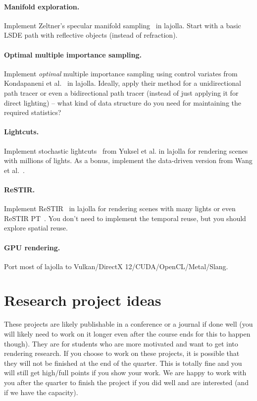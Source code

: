 \paragraph{Manifold exploration.} Implement Zeltner's specular manifold sampling~\cite{Zeltner:2020:SMS} in lajolla. Start with a basic LSDE path with reflective objects (instead of refraction).

\paragraph{Optimal multiple importance sampling.}
Implement \emph{optimal} multiple importance sampling using control variates from Kondapaneni et al.~\cite{Kondapaneni:2019:OMI} in lajolla.
Ideally, apply their method for a unidirectional path tracer or even a bidirectional path tracer (instead of just applying it for direct lighting) -- what kind of data structure do you need for maintaining the required statistics?

\paragraph{Lightcuts.}
Implement stochastic lightcuts~\cite{Yuksel:2019:SL} from Yuksel et al. in lajolla for rendering scenes with millions of lights.
As a bonus, implement the data-driven version from Wang et al.~\cite{Wang:2021:LCR}.

\paragraph{ReSTIR.}
Implement ReSTIR~\cite{Bitterli:2020:SRR} in lajolla for rendering scenes with many lights or even ReSTIR PT~\cite{Lin:2022:GRI}.
You don't need to implement the temporal reuse, but you should explore spatial reuse.

\paragraph{GPU rendering.}
Port most of lajolla to Vulkan/DirectX 12/CUDA/OpenCL/Metal/Slang.

\section{Research project ideas}
These projects are likely publishable in a conference or a journal if done well (you will likely need to work on it longer even after the course ends for this to happen though).
They are for students who are more motivated and want to get into rendering research.
If you choose to work on these projects, it is possible that they will not be finished at the end of the quarter. This is totally fine and you will still get high/full points if you show your work.
We are happy to work with you after the quarter to finish the project if you did well and are interested (and if we have the capacity).

